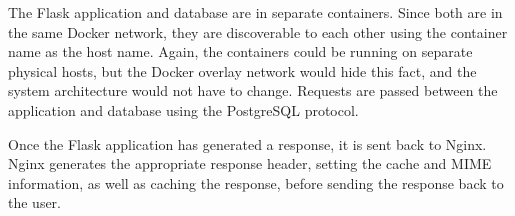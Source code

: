 The Flask application and database are in separate containers. Since
both are in the same Docker network, they are discoverable to each other
using the container name as the host name. Again, the containers could
be running on separate physical hosts, but the Docker overlay network
would hide this fact, and the system architecture would not have to
change. Requests are passed between the application and database using
the PostgreSQL protocol.

Once the Flask application has generated a response, it is sent back to
Nginx. Nginx generates the appropriate response header, setting the
cache and MIME information, as well as caching the response, before
sending the response back to the user.
